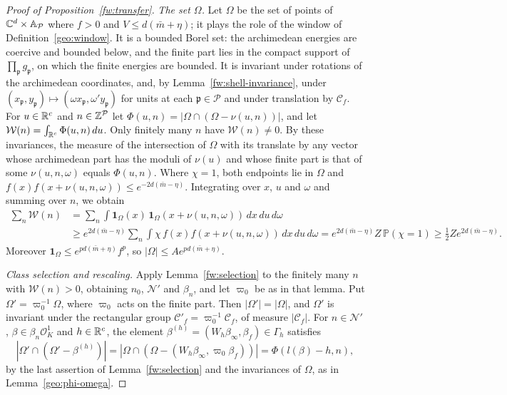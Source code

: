 \begin{proof}[Proof of Proposition~\ref{fw:transfer}]
\emph{The set $\Omega$.} Let $\Omega$ be the set of points of
$\mathbb C^d\times\mathbb A_{\mathcal P}$ where $f>0$ and $V\le d(\bar m+\eta)$;
it plays the role of the window of Definition~\ref{geo:window}. It is a
bounded Borel set: the archimedean energies are coercive and bounded
below, and the finite part lies in the compact support of
$\prod_{\mathfrak p}g_{\mathfrak p}$, on which the finite energies are
bounded. It is invariant under rotations of the archimedean
coordinates, and, by Lemma~\ref{fw:shell-invariance}, under
$(x_{\mathfrak p},y_{\mathfrak p})\mapsto(\omega x_{\mathfrak
p},\omega'y_{\mathfrak p})$ for units at each $\mathfrak p\in\mathcal P$
and under translation by $\mathcal C_f$. For $u\in\mathbb R^c$ and
$n\in\mathbb Z^{\mathcal P}$ let $\Phi(u,n)=|\Omega\cap(\Omega-\nu(u,n))|$, and
let $\mathcal W(n)=\int_{\mathbb R^c}\Phi(u,n)\,du$. Only finitely many $n$ have
$\mathcal W(n)\ne0$. By these invariances, the measure of the
intersection of $\Omega$ with its translate by any vector whose
archimedean part has the moduli of $\nu(u)$ and whose finite part is
that of some $\nu(u,n,\omega)$ equals $\Phi(u,n)$. Where $\chi=1$, both
endpoints lie in $\Omega$ and $f(x)f(x+\nu(u,n,\omega))\le
e^{-2d(\bar m-\eta)}$. Integrating over $x$, $u$ and $\omega$ and
summing over $n$, we obtain
\[
 \begin{split}
 \sum_n\mathcal W(n)
 &=\sum_n\int\mathbf 1_\Omega(x)\,\mathbf 1_\Omega(x+\nu(u,n,\omega))\,
 dx\,du\,d\omega\\
 &\ge e^{2d(\bar m-\eta)}\sum_n\int\chi\,f(x)f(x+\nu(u,n,\omega))\,
 dx\,du\,d\omega
 =e^{2d(\bar m-\eta)}Z\,\mathbb P(\chi=1)
 \ge\tfrac12Ze^{2d(\bar m-\eta)} .
 \end{split}
\]
Moreover $\mathbf 1_\Omega\le e^{pd(\bar m+\eta)}f^p$, so
$|\Omega|\le Ae^{pd(\bar m+\eta)}$.

\emph{Class selection and rescaling.} Apply Lemma~\ref{fw:selection} to
the finitely many $n$ with $\mathcal W(n)>0$, obtaining $n_0$,
$\mathcal N'$ and $\beta_n$, and let $\varpi_0$ be as in that lemma.
Put $\Omega'=\varpi_0^{-1}\Omega$, where $\varpi_0$ acts on the finite
part. Then $|\Omega'|=|\Omega|$, and $\Omega'$ is invariant under the
rectangular group $\mathcal C'_f=\varpi_0^{-1}\mathcal C_f$, of measure
$|\mathcal C_f|$. For $n\in\mathcal N'$, $\beta\in\beta_n\mathcal O_K^1$
and $h\in\mathbb R^c$, the element $\beta^{(h)}=(W_h\beta_\infty,\beta_f)\in
\Gamma_h$ satisfies
\[
 |\Omega'\cap(\Omega'-\beta^{(h)})|=|\Omega\cap(\Omega-(W_h\beta_\infty,
 \varpi_0\beta_f))|=\Phi(l(\beta)-h,n),
\]
by the last assertion of Lemma~\ref{fw:selection} and the invariances of
$\Omega$, as in Lemma~\ref{geo:phi-omega}.


\end{proof}
